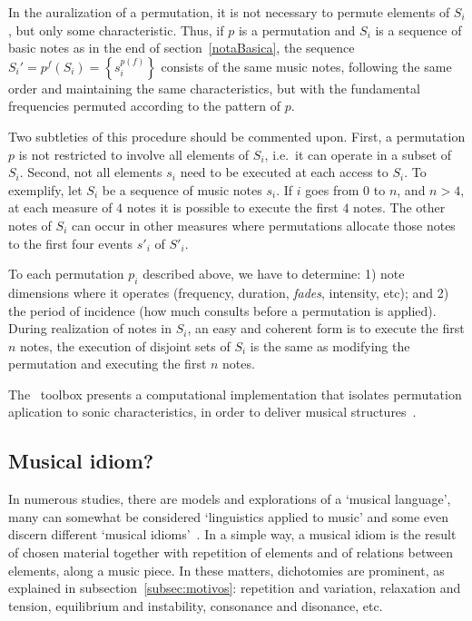 In the auralization of a permutation, it is not necessary to permute elements of $S_i$,
but only some characteristic. Thus, if $p$ is a permutation and $S_i$ is a sequence of basic notes as in the end of section~\ref{notaBasica}, the
sequence $S_i'=p^f(S_i)=\left\{s_i^{p(f)}\right\}$ consists of the same
music notes, following the same order and maintaining the same characteristics, but with the
fundamental frequencies permuted according to the pattern of $p$.

Two subtleties of this procedure should be commented upon. 
First, a permutation $p$ is not restricted to involve all elements of $S_i$, i.e.\ it can operate in a subset of $S_i$.
Second, not all elements $s_i$ need to be executed at each access to $S_i$. To exemplify, let $S_i$ be a sequence of music notes $s_i$. 
If $i$ goes from $0$ to $n$, and
$n>4$, at each measure of $4$ notes it is possible to execute the first $4$
notes.
The other notes of $S_i$ can occur in other measures where permutations 
allocate those notes to the first four events $s'_i$ of $S'_i$.

To each permutation $p_i$ described above, we have to determine:
1) note dimensions where it operates (frequency, duration, \emph{fades},
intensity, etc); and
2) the period of incidence (how much consults before a permutation is
applied). During realization of notes in $S_i$, an easy and coherent form is to
execute the first $n$ notes, the execution of disjoint sets of $S_i$
is the same as modifying the permutation and executing the first $n$ notes.

The \massa\ toolbox presents a computational implementation that isolates
permutation aplication to sonic characteristics, in order to deliver
musical structures~\cite{MASSA,figgusOriginal,figgusEspacializacao}.

\subsection{Musical idiom?}

In numerous studies, there are models and explorations of a `musical language',
many can somewhat be considered `linguistics applied to music'
and some even discern different `musical
idioms'~\cite{Lerdahl, Harmonia, Salzer,Alfaix}. In a simple way, a musical idiom
is the result of chosen material together with repetition of elements and
of relations between elements, along a music piece. In these matters, 
dichotomies are prominent, as explained in subsection~\ref{subsec:motivos}:
repetition and variation, relaxation and tension, equilibrium and instability, consonance and disonance, etc.

